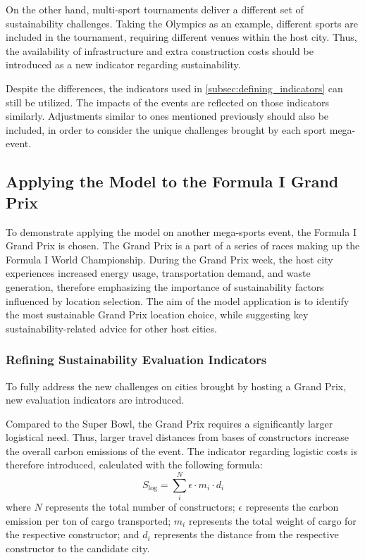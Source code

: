 \documentclass{mcmthesis}
\begin{document}
On the other hand, multi-sport tournaments deliver a different set of sustainability challenges. Taking the Olympics as an example, different sports are included in the tournament, requiring different venues within the host city. Thus, the availability of infrastructure and extra construction costs should be introduced as a new indicator regarding sustainability. 

Despite the differences, the indicators used in \cref{subsec:defining_indicators} can still be utilized. The impacts of the events are reflected on those indicators similarly. Adjustments similar to ones mentioned previously should also be included, in order to consider the unique challenges brought by each sport mega-event. 


\subsection{Applying the Model to the Formula I Grand Prix} \label{subsec:model_application_f1}

To demonstrate applying the model on another mega-sports event, the Formula I Grand Prix is chosen. The Grand Prix is a part of a series of races making up the Formula I World Championship. During the Grand Prix week, the host city experiences increased energy usage, transportation demand, and waste generation, therefore emphasizing the importance of sustainability factors influenced by location selection. The aim of the model application is to identify the most sustainable Grand Prix location choice, while suggesting key sustainability-related advice for other host cities. 

\subsubsection{Refining Sustainability Evaluation Indicators} \label{subsubsec:f1_new_indicators}

To fully address the new challenges on cities brought by hosting a Grand Prix, new evaluation indicators are introduced. 

Compared to the Super Bowl, the Grand Prix requires a significantly larger logistical need. Thus, larger travel distances from bases of constructors increase the overall carbon emissions of the event. The indicator regarding logistic costs is therefore introduced, calculated with the following formula: 
\begin{equation}
    S_\text{log} = \sum^N_i \epsilon \cdot m_i \cdot d_i 
\end{equation}
where $N$ represents the total number of constructors; $\epsilon$ represents the carbon emission per ton of cargo transported; $m_i$ represents the total weight of cargo for the respective constructor; and $d_i$ represents the distance from the respective constructor to the candidate city. 
\end{document}
